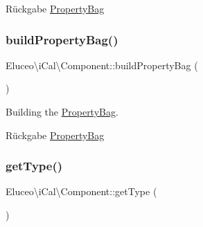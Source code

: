 \begin{DoxyReturn}{Rückgabe}
\mbox{\hyperlink{class_eluceo_1_1i_cal_1_1_property_bag}{Property\+Bag}} 
\end{DoxyReturn}
\mbox{\label{class_eluceo_1_1i_cal_1_1_component_a07ad9d3af0984b1299433a37b30c6608}} 
\subsubsection{\texorpdfstring{build\+Property\+Bag()}{buildPropertyBag()}\hspace{0.1cm}{\footnotesize\ttfamily [3/3]}}
{\footnotesize\ttfamily Eluceo\textbackslash{}i\+Cal\textbackslash{}\+Component\+::build\+Property\+Bag (\begin{DoxyParamCaption}{ }\end{DoxyParamCaption})\hspace{0.3cm}{\ttfamily [abstract]}}

Building the \mbox{\hyperlink{class_eluceo_1_1i_cal_1_1_property_bag}{Property\+Bag}}.

\begin{DoxyReturn}{Rückgabe}
\mbox{\hyperlink{class_eluceo_1_1i_cal_1_1_property_bag}{Property\+Bag}} 
\end{DoxyReturn}
\mbox{\label{class_eluceo_1_1i_cal_1_1_component_aa6d20c67a9852dd5ca7951c996a98418}} 
\subsubsection{\texorpdfstring{get\+Type()}{getType()}\hspace{0.1cm}{\footnotesize\ttfamily [1/3]}}
{\footnotesize\ttfamily Eluceo\textbackslash{}i\+Cal\textbackslash{}\+Component\+::get\+Type (\begin{DoxyParamCaption}{ }\end{DoxyParamCaption})\hspace{0.3cm}{\ttfamily [abstract]}}

